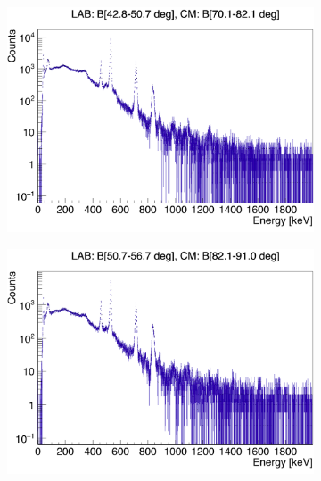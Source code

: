 \documentclass[twoside,english]{uiofysmaster/uiofysmaster}
\begin{document}
\begin{figure}[htb!]
\begin{subfigure}[t]{0.49\textwidth}
		\includegraphics[width=\textwidth]{../Plots/plotting/Projections-combined/B_dcB_x-ProjY_9-12_combined}
		\caption{}
	\end{subfigure}
	\hfill
	\begin{subfigure}[t]{0.49\textwidth}
		\centering
		\includegraphics[width=\textwidth]{../Plots/plotting/Projections-combined/B_dcB_x-ProjY_13-16_combined}
		\caption{}
	\end{subfigure}
	\begin{subfigure}[t]{0.49\textwidth}
		\centering

\end{subfigure}
\end{figure}
\end{document}
